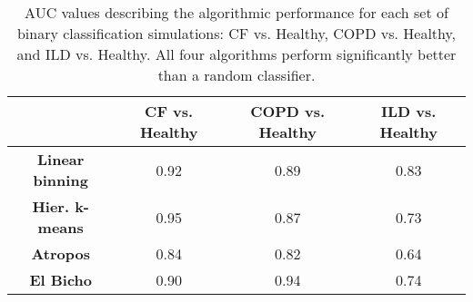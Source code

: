 
\begin{table*}[!htb]
 \centering
 \begin{tabular}{c c c c}
   \toprule
   {} & {\bf CF vs. Healthy} & {\bf COPD vs. Healthy} & {\bf ILD vs. Healthy} \\
   \hline
   {\bf Linear binning} & 0.92  &  0.89  &  0.83  \\
   {\bf Hier. k-means} & 0.95  &  0.87  &  0.73  \\
   {\bf Atropos} &  0.84  &  0.82  &  0.64  \\
   {\bf El Bicho} &  0.90  &  0.94  &  0.74  \\
   \hline
   \bottomrule
   \end{tabular}
 \caption{AUC values describing the algorithmic performance for each set of binary
          classification simulations: CF vs. Healthy, COPD vs. Healthy, and
          ILD vs. Healthy.  All four algorithms perform significantly better than a
          random classifier.
          }
 \label{table:auc}
\end{table*}
